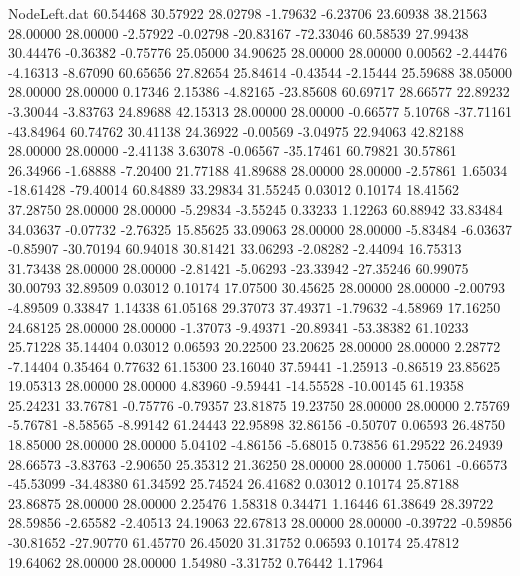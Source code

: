 \begin{filecontents}{NodeLeft.dat}
  60.54468   30.57922   28.02798    -1.79632   -6.23706   23.60938   38.21563   28.00000   28.00000   -2.57922   -0.02798  -20.83167  -72.33046
  60.58539   27.99438   30.44476    -0.36382   -0.75776   25.05000   34.90625   28.00000   28.00000    0.00562   -2.44476   -4.16313   -8.67090
  60.65656   27.82654   25.84614    -0.43544   -2.15444   25.59688   38.05000   28.00000   28.00000    0.17346    2.15386   -4.82165  -23.85608
  60.69717   28.66577   22.89232    -3.30044   -3.83763   24.89688   42.15313   28.00000   28.00000   -0.66577    5.10768  -37.71161  -43.84964
  60.74762   30.41138   24.36922    -0.00569   -3.04975   22.94063   42.82188   28.00000   28.00000   -2.41138    3.63078   -0.06567  -35.17461
  60.79821   30.57861   26.34966    -1.68888   -7.20400   21.77188   41.89688   28.00000   28.00000   -2.57861    1.65034  -18.61428  -79.40014
  60.84889   33.29834   31.55245     0.03012    0.10174   18.41562   37.28750   28.00000   28.00000   -5.29834   -3.55245    0.33233    1.12263
  60.88942   33.83484   34.03637    -0.07732   -2.76325   15.85625   33.09063   28.00000   28.00000   -5.83484   -6.03637   -0.85907  -30.70194
  60.94018   30.81421   33.06293    -2.08282   -2.44094   16.75313   31.73438   28.00000   28.00000   -2.81421   -5.06293  -23.33942  -27.35246
  60.99075   30.00793   32.89509     0.03012    0.10174   17.07500   30.45625   28.00000   28.00000   -2.00793   -4.89509    0.33847    1.14338
  61.05168   29.37073   37.49371    -1.79632   -4.58969   17.16250   24.68125   28.00000   28.00000   -1.37073   -9.49371  -20.89341  -53.38382
  61.10233   25.71228   35.14404     0.03012    0.06593   20.22500   23.20625   28.00000   28.00000    2.28772   -7.14404    0.35464    0.77632
  61.15300   23.16040   37.59441    -1.25913   -0.86519   23.85625   19.05313   28.00000   28.00000    4.83960   -9.59441  -14.55528  -10.00145
  61.19358   25.24231   33.76781    -0.75776   -0.79357   23.81875   19.23750   28.00000   28.00000    2.75769   -5.76781   -8.58565   -8.99142
  61.24443   22.95898   32.86156    -0.50707    0.06593   26.48750   18.85000   28.00000   28.00000    5.04102   -4.86156   -5.68015    0.73856
  61.29522   26.24939   28.66573    -3.83763   -2.90650   25.35312   21.36250   28.00000   28.00000    1.75061   -0.66573  -45.53099  -34.48380
  61.34592   25.74524   26.41682     0.03012    0.10174   25.87188   23.86875   28.00000   28.00000    2.25476    1.58318    0.34471    1.16446
  61.38649   28.39722   28.59856    -2.65582   -2.40513   24.19063   22.67813   28.00000   28.00000   -0.39722   -0.59856  -30.81652  -27.90770
  61.45770   26.45020   31.31752     0.06593    0.10174   25.47812   19.64062   28.00000   28.00000    1.54980   -3.31752    0.76442    1.17964

\end{filecontents}
